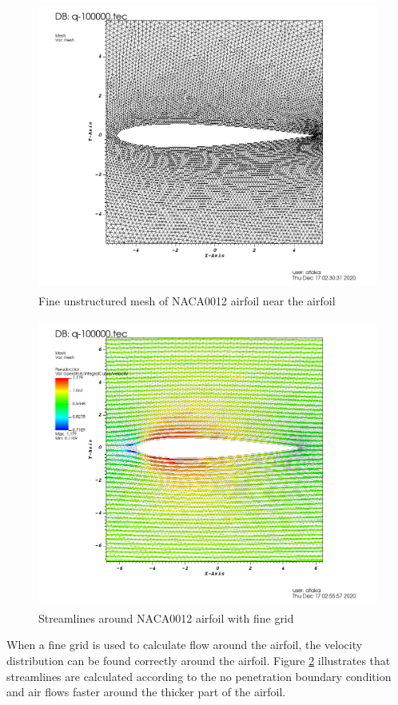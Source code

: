 \documentclass[letterpaper,12pt]{article}
\begin{document}
\begin{figure} [!h]
	\centering
	\includegraphics[height = 9.5cm]{graph/fine/fine_209480001.png}
	\caption{Fine unstructured mesh of NACA0012 airfoil near the airfoil}
    \label{fig:airfoilmeshfineclose}
\end{figure}
\begin{figure} [!h]
	\centering
	\includegraphics[height = 9.5cm]{graph/fine/fine_streamline0000.png}
	\caption{Streamlines around NACA0012 airfoil with fine grid}
    \label{fig:airfoilfinestreamline}
\end{figure}

\newpage

When a fine grid is used to calculate flow around the airfoil, the velocity distribution
can be found correctly around the airfoil. Figure \ref{fig:airfoilfinestreamline} 
illustrates that streamlines are calculated according to the no penetration boundary 
condition and air flows faster around the thicker part of the airfoil.
\end{document}
